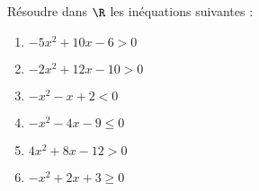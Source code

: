 \documentclass[a4paper,11pt,exos]{nsi} %
\begin{document}
\maketitle


Résoudre dans $\R$ les inéquations suivantes :
\begin{multicols}{2}
    \begin{enumerate}[itemsep=1em]
        \item $-5x^2+10x-6> 0$
	    \item $-2x^2+12x-10>0$
	    \item $-x^2-x+2< 0$
	    \item $-x^2-4x-9\leqslant 0$
	    \item $4x^2+8x-12>0$
	    \item $-x^2+2x+3\geqslant 0$
    \end{enumerate}
\end{multicols}
\end{document}
